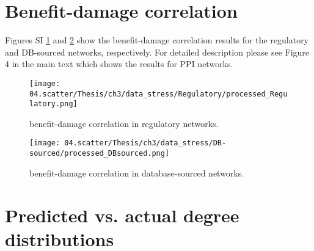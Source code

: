 \documentclass[12pt]{article}	%
\begin{document}
\section{Benefit-damage correlation}\label{sup_extra_BD_corr}
    Figures SI \ref{fig_data_stress_Regulatory} and \ref{fig_data_stress_DBs} show the benefit-damage correlation results for the regulatory and DB-sourced networks, respectively. For detailed description please see Figure 4 in the main text which shows the results for PPI networks.

    \begin{figure}[H]%
        \texttt{[image: 04.scatter/Thesis/ch3/data\_stress/Regulatory/processed\_Regulatory.png]}
        \caption
                {
                    benefit-damage correlation in regulatory networks.
                }
        \label{fig_data_stress_Regulatory}
    \end{figure}

    \begin{figure}[H]%
                \texttt{[image: 04.scatter/Thesis/ch3/data\_stress/DB-sourced/processed\_DBsourced.png]}
                \caption
                        {
                            benefit-damage correlation in database-sourced networks.
                        }
                \label{fig_data_stress_DBs}
            \end{figure}
\newpage
\section{Predicted vs. actual degree distributions}\label{sup_prediction}
\end{document}

